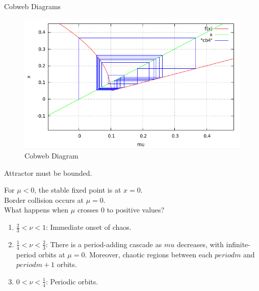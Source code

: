 \documentclass[xcolor=x11names,compress]{beamer}
\renewcommand{\(}{\begin{columns}}
\renewcommand{\)}{\end{columns}}
\newcommand{\<}[1]{\begin{column}{#1}}
\renewcommand{\>}{\end{column}}
\begin{document}
\begin{frame}{Cobweb Diagrams}
\begin{figure}
  \caption{Cobweb Diagram}
  \begin{center}
    \includegraphics[width=0.9\columnwidth]{cb}
  \end{center}
\end{figure}
Attractor must be bounded.  

\end{frame}


\begin{frame}
For $\mu<0$, the stable fixed point is at $x=0$.  \\
Border collision occurs at $\mu=0$.  \\
What happens when $\mu$ crosses $0$ to positive values?\\
\pause{}

\begin{enumerate}
\item $\frac{2}{3}<\nu<1$: Immediate onset of chaos.  
\item $\frac{1}{4}<\nu<\frac{2}{3}$: There is a period-adding cascade as $mu$ 
decreases, with infinite-period orbits at $\mu=0$.  Moreover, chaotic regions 
between each $period m$ and $period m+1$ orbits.  
\item $0<\nu<\frac{1}{4}$: Periodic orbits.  
\end{enumerate}
\end{frame}
\end{document}
